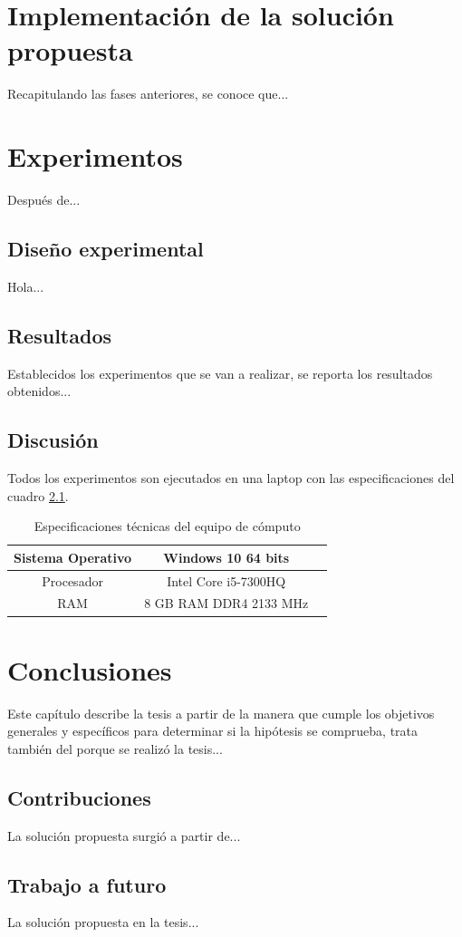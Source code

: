 \chapter{Implementación de la solución propuesta}
Recapitulando las fases anteriores, se conoce que...


\chapter{Experimentos}
Después de...

\section{Diseño experimental}
Hola...

\section{Resultados}
Establecidos los experimentos que se van a realizar, se reporta los resultados obtenidos...

\section{Discusión}
Todos los experimentos son ejecutados en una laptop con las especificaciones del cuadro \ref{tab:Especificaciones técnicas del PC}.

\begin{table}[H]
	{\centering
		\caption{Especificaciones técnicas del equipo de cómputo}
		\begin{tabular}{|c|c|c|}
			\hline
			Sistema Operativo & Windows 10 64 bits\\
			\hline
			Procesador & Intel Core i5-7300HQ\\
			\hline
			RAM & 8 GB RAM DDR4 2133 MHz\\
			\hline
		\end{tabular}

	\label{tab:Especificaciones técnicas del PC}
	}
\end{table}


\chapter{Conclusiones}
Este capítulo describe la tesis a partir de la manera que cumple los objetivos generales y específicos para determinar si la hipótesis se comprueba, trata también del porque se realizó la tesis...

\clearpage

\section{Contribuciones}
La solución propuesta surgió a partir de...

\section{Trabajo a futuro}
La solución propuesta en la tesis...